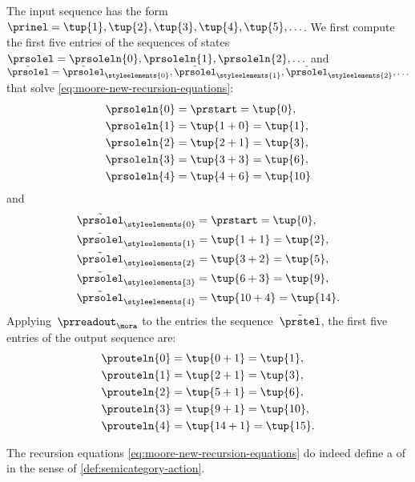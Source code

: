 \begin{example}
    The input sequence has the form~$\prinel = \tup{1}, \tup{2}, \tup{3}, \tup{4}, \tup{5}, \ldots$.
    We first compute the first five entries of the sequences of states~$\prsolel = \prsoleln{0}, \prsoleln{1}, \prsoleln{2}, \ldots$ and~$\tilde{\prsolel} = \tilde{\prsolel}_\styleelements{0}, \tilde{\prsolel}_\styleelements{1}, \tilde{\prsolel}_\styleelements{2}, \ldots$ that solve \cref{eq:moore-new-recursion-equations}:
    \begin{align}\label{eq:moore-action-example-calc-1}
        \prsoleln{0} & = \prstart = \tup{0}, \\
        \prsoleln{1} & = \tup{1 + 0} = \tup{1}, \\
        \prsoleln{2} & = \tup{2 + 1} = \tup{3}, \\
        \prsoleln{3} & = \tup{3 + 3} = \tup{6}, \\
        \prsoleln{4} & = \tup{4 + 6} = \tup{10}
    \end{align}
    and
    \begin{align}\label{eq:moore-action-example-calc-2}
        \tilde{\prsolel}_\styleelements{0} & = \prstart = \tup{0}, \\
        \tilde{\prsolel}_\styleelements{1} & = \tup{1 + 1} = \tup{2}, \\
        \tilde{\prsolel}_\styleelements{2} & = \tup{3 + 2} = \tup{5}, \\
        \tilde{\prsolel}_\styleelements{3} & = \tup{6 + 3} = \tup{9}, \\
        \tilde{\prsolel}_\styleelements{4} & = \tup{10 + 4} = \tup{14}.
    \end{align}
    Applying~$\prreadout_\mora$ to the entries the sequence~$\tilde \prstel$, the first five entries of the output sequence are:
    \begin{align}\label{eq:moore-action-example-calc-3}
        \prouteln{0} & = \tup{0 + 1} = \tup{1}, \\
        \prouteln{1} & = \tup{2 + 1} = \tup{3}, \\
        \prouteln{2} & = \tup{5 + 1} = \tup{6}, \\
        \prouteln{3} & = \tup{9 + 1} = \tup{10}, \\
        \prouteln{4} & = \tup{14 + 1} = \tup{15}.
    \end{align}
\end{example}


\begin{lemma}\label{lem:moore-new-recursion-equations}
    The recursion equations \cref{eq:moore-new-recursion-equations} do indeed define a  of  in the sense of \cref{def:semicategory-action}.
\end{lemma}

